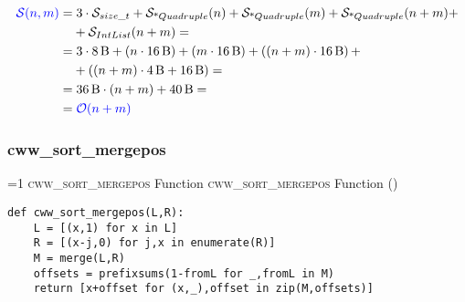            \begin{frame}{\cwwsortmergebitscostframe}
                \begin{align*}
                    \textcolor{blue}{\mathcal{S}{\left(n , m\right)}} = & \; 3 \cdot \mathcal{S}_{size\_t} + \mathcal{S}_{\textnormal{*}Quadruple}{\left(n\right)} + \mathcal{S}_{\textnormal{*}Quadruple}{\left(m\right)} + \mathcal{S}_{\textnormal{*}Quadruple}{\left(n + m\right)} + \\
                    & + \mathcal{S}_{IntList}{\left(n + m\right)} = \\
                    = & \; 3 \cdot \SI{8}{B} + \left(n \cdot \SI{16}{B}\right) + \left(m \cdot \SI{16}{B}\right) + \left(\left(n + m\right) \cdot \SI{16}{B}\right) + \\
                    & + \left(\left(n + m\right) \cdot \SI{4}{B} + \SI{16}{B}\right) = \\
                    = & \; \SI{36}{B} \cdot \left(n + m\right) + \SI{40}{B} = \\
                    = & \; \textcolor{blue}{\mathcal{O}{\left(n + m\right)}}
                \end{align*}
            \end{frame}           

        \subsubsection{cww\_sort\_mergepos}
\setcounter{cwwSortMergePosfunctioncounter}{1}
\newcommand{\cwwSortMergePosfunctionframe}{%
    \ifnum\value{cwwSortMergePosfunctioncounter}=1
        \textsc{cww\_sort\_mergepos} Function%
    \else
        \textsc{cww\_sort\_mergepos} Function (\thecwwSortMergePosfunctioncounter)%
    \fi
}
            \begin{frame}[containsverbatim]{\cwwSortMergePosfunctionframe}
                \begin{verbatim}
def cww_sort_mergepos(L,R):
    L = [(x,1) for x in L]
    R = [(x-j,0) for j,x in enumerate(R)]
    M = merge(L,R)
    offsets = prefixsums(1-fromL for _,fromL in M)
    return [x+offset for (x,_),offset in zip(M,offsets)]
                    \end{verbatim}
            \end{frame}

